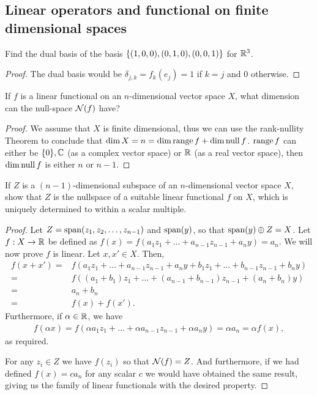 \subsection{Linear operators and functional on finite dimensional spaces}


\begin{exercise}{3}
Find the dual basis of the basis $\{(1,0,0), (0,1,0), (0,0,1)\}$ for $\mathbb{R}^3$.
\end{exercise}
\begin{proof}
The dual basis would be $\delta_{j,k}=f_k(e_j)=1$ if $k=j$ and 0 otherwise.
\end{proof}

\begin{exercise}{5}
If $f$ is a linear functional on an $n$-dimensional vector space $X$, what dimension can the null-space $\mathcal{N}(f)$ have?
\end{exercise}
\begin{proof}
We assume that $X$ is finite dimensional, thus we can use the rank-nullity Theorem to conclude that $\dim X = n=\dim\operatorname*{range} f +\dim\operatorname*{null} f$.
$\operatorname*{range} f$ can either be $\{0\}, \mathbb{C}$ (as a complex vector space) or $\mathbb{R}$ (as a real vector space), then $\dim\operatorname*{null} f$ is either $n$ or $n-1$.
\end{proof}

\begin{exercise}{8}
If $Z$ is a $(n-1)$-dimensional subspace of an $n$-dimensional vector space $X$, show that $Z$ is the nullspace of a suitable linear functional $f$ on $X$, which is uniquely determined to within a scalar multiple.
\end{exercise}
\begin{proof}
Let $Z=\operatorname*{span}(z_1,z_2,\dots,z_{n-1})$ and $\operatorname*{span}(y)$, so that $\operatorname*{span}(y)\oplus Z=X$.
Let $f:X\to\mathbb{R}$ be defined as $f(x)=f(a_1z_1+\dots+a_{n-1}z_{n-1}+a_ny)=a_n$.
We will now prove $f$ is linear.
Let $x,x'\in X$.
Then,
\begin{align*}
    f(x+x') 
    =& f(a_1z_1+\dots+a_{n-1}z_{n-1}+a_ny+b_1z_1+\dots+b_{n-1}z_{n-1}+b_ny)\\
    =& f((a_1+b_1)z_1+\dots+(a_{n-1}+b_{n-1})z_{n-1}+(a_n+b_n)y)\\
    =& a_n+b_n\\
    =& f(x)+f(x').
\end{align*}
Furthermore, if $\alpha\in\mathbb{R}$, we have
\begin{align*}
    f(\alpha x)
    = f(\alpha a_1z_1+\dots+\alpha a_{n-1}z_{n-1}+\alpha a_ny)
    = \alpha a_n
    = \alpha f(x),
\end{align*}
as required.

For any $z_i\in Z$ we have $f(z_i)$ so that $\mathcal{N}(f)=Z$.
And furthermore, if we had defined $f(x)=ca_n$ for any scalar $c$ we would have obtained the same result, giving us the family of linear functionals with the desired property.
\end{proof}

